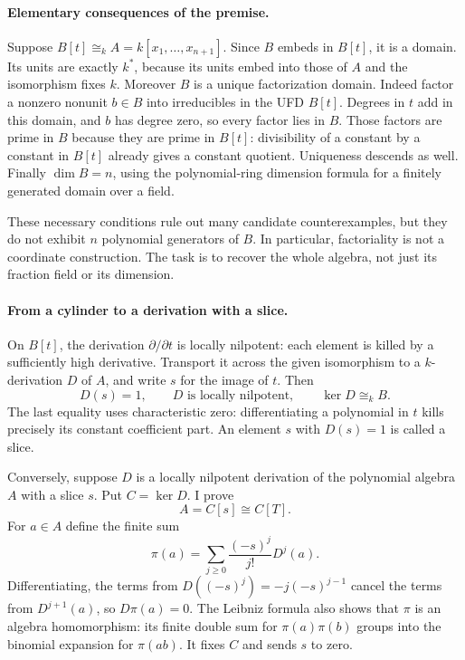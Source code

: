 \documentclass[11pt]{article}
\begin{document}
\paragraph{Elementary consequences of the premise.}
Suppose $B[t]\cong_k A=k[x_1,\ldots,x_{n+1}]$. Since $B$ embeds in
$B[t]$, it is a domain. Its units are exactly $k^*$, because its units
embed into those of $A$ and the isomorphism fixes $k$. Moreover $B$
is a unique factorization domain. Indeed factor a nonzero nonunit
$b\in B$ into irreducibles in the UFD $B[t]$. Degrees in $t$ add in
this domain, and $b$ has degree zero, so every factor lies in $B$.
Those factors are prime in $B$ because they are prime in $B[t]$:
divisibility of a constant by a constant in $B[t]$ already gives a
constant quotient. Uniqueness descends as well. Finally
$\dim B=n$, using the polynomial-ring dimension formula for a
finitely generated domain over a field.

These necessary conditions rule out many candidate counterexamples,
but they do not exhibit $n$ polynomial generators of $B$. In particular,
factoriality is not a coordinate construction. The task is to recover
the whole algebra, not just its fraction field or its dimension.

\paragraph{From a cylinder to a derivation with a slice.}
On $B[t]$, the derivation $\partial/\partial t$ is locally nilpotent:
each element is killed by a sufficiently high derivative. Transport
it across the given isomorphism to a $k$-derivation $D$ of $A$, and
write $s$ for the image of $t$. Then
\[
 D(s)=1,\qquad D\text{ is locally nilpotent},\qquad
 \ker D\cong_k B.                                    \tag{1}
\]
The last equality uses characteristic zero: differentiating a polynomial
in $t$ kills precisely its constant coefficient part. An element $s$
with $D(s)=1$ is called a slice.

Conversely, suppose $D$ is a locally nilpotent derivation of the
polynomial algebra $A$ with a slice $s$. Put $C=\ker D$. I prove
\[
 A=C[s]\cong C[T].                                    \tag{2}
\]
For $a\in A$ define the finite sum
\[
 \pi(a)=\sum_{j\ge0}\frac{(-s)^j}{j!}D^j(a).
                                                        \tag{3}
\]
Differentiating, the terms from $D((-s)^j)=-j(-s)^{j-1}$ cancel the
terms from $D^{j+1}(a)$, so $D\pi(a)=0$. The Leibniz formula also
shows that $\pi$ is an algebra homomorphism: its finite double sum
for $\pi(a)\pi(b)$ groups into the binomial expansion for
$\pi(ab)$. It fixes $C$ and sends $s$ to zero.
\end{document}
